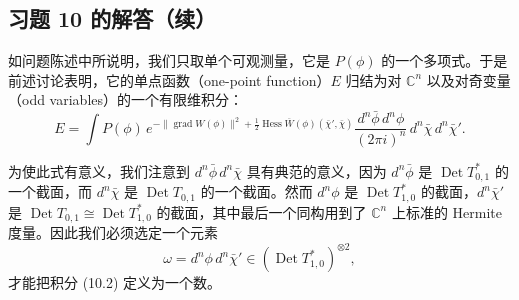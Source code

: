
\subsection{习题 10 的解答（续）}

如问题陈述中所说明，我们只取单个可观测量，它是 $P(\phi)$ 的一个多项式。于是前述讨论表明，它的单点函数（one-point function）$E$ 归结为对 $\mathbb{C}^n$ 以及对奇变量（odd variables）的一个有限维积分：
\begin{equation}
  \tag{10.2}
  \label{eq:sol10-2}
  E=\int P(\phi)\,e^{-\|\operatorname{grad}W(\phi)\|^2+\frac12\operatorname{Hess}\overline{W}(\phi)(\bar\chi',\bar\chi)}
  \frac{d^n\bar\phi\,d^n\phi}{(2\pi i)^n}\,d^n\bar\chi\,d^n\bar\chi'.
\end{equation}

为使此式有意义，我们注意到 $d^n\bar\phi\,d^n\bar\chi$ 具有典范的意义，因为 $d^n\bar\phi$ 是 $\operatorname{Det}T^*_{0,1}$ 的一个截面，而 $d^n\bar\chi$ 是 $\operatorname{Det}T_{0,1}$ 的一个截面。然而 $d^n\phi$ 是 $\operatorname{Det}T^*_{1,0}$ 的截面，$d^n\bar\chi'$ 是 $\operatorname{Det}T_{0,1}\cong\operatorname{Det}T^*_{1,0}$ 的截面，其中最后一个同构用到了 $\mathbb{C}^n$ 上标准的 Hermite 度量。因此我们必须选定一个元素
\[
  \omega=d^n\phi\,d^n\bar\chi'\in(\operatorname{Det}T^*_{1,0})^{\otimes2},
\]
才能把积分 (10.2) 定义为一个数。



